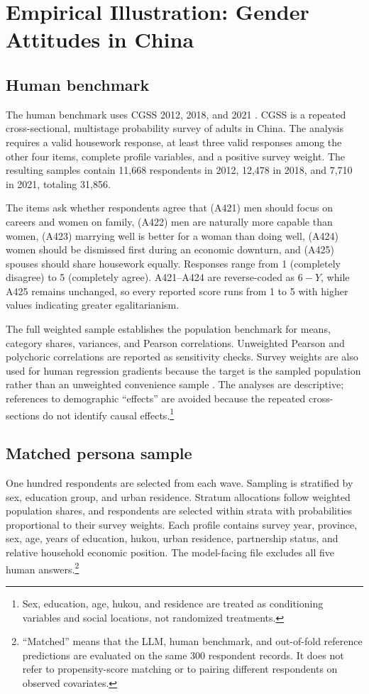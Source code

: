 \documentclass[10pt,twocolumn]{article}
\newcommand{\CGSS}{CGSS\xspace}
\begin{document}
\section{Empirical Illustration: Gender Attitudes in China}

\subsection{Human benchmark}

The human benchmark uses \CGSS 2012, 2018, and 2021
\parencite{cgssdata}. \CGSS is a repeated cross-sectional, multistage probability survey of adults in
China. The analysis requires a valid housework response, at least three valid responses among the
other four items, complete profile variables, and a positive survey weight. The resulting samples
contain 11,668 respondents in 2012, 12,478 in 2018, and 7,710 in 2021, totaling 31,856.

The items ask whether respondents agree that (A421) men should focus on careers and women on family,
(A422) men are naturally more capable than women, (A423) marrying well is better for a woman than
doing well, (A424) women should be dismissed first during an economic downturn, and (A425) spouses
should share housework equally. Responses range from 1 (completely disagree) to 5 (completely agree).
A421--A424 are reverse-coded as $6-Y$, while A425 remains unchanged, so every reported score runs
from 1 to 5 with higher values indicating greater egalitarianism.

The full weighted sample establishes the population benchmark for means, category shares, variances,
and Pearson correlations. Unweighted Pearson and polychoric correlations are reported as sensitivity
checks. Survey weights are also used for human regression gradients because the target is the
sampled population rather than an unweighted convenience sample \parencite{solon2015weighting}. The
analyses are descriptive; references to demographic ``effects'' are avoided because the repeated
cross-sections do not identify causal effects.\footnote{Sex, education, age, hukou, and residence
are treated as conditioning variables and social locations, not randomized treatments.}

\subsection{Matched persona sample}

One hundred respondents are selected from each wave. Sampling is stratified by sex, education group,
and urban residence. Stratum allocations follow weighted population shares, and respondents are
selected within strata with probabilities proportional to their survey weights. Each profile
contains survey year, province, sex, age, years of education, hukou, urban residence, partnership
status, and relative household economic position. The model-facing file excludes all five human
answers.\footnote{``Matched'' means that the LLM, human benchmark, and out-of-fold reference
predictions are evaluated on the same 300 respondent records. It does not refer to propensity-score
matching or to pairing different respondents on observed covariates.}
\end{document}
